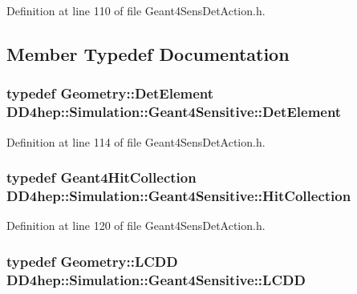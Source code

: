 Definition at line 110 of file Geant4SensDetAction.h.

\subsection{Member Typedef Documentation}
\hypertarget{class_d_d4hep_1_1_simulation_1_1_geant4_sensitive_a1cb1af5fb1194be1e1c1137f1e54272b}{
\subsubsection[{DetElement}]{\setlength{\rightskip}{0pt plus 5cm}typedef {\bf Geometry::DetElement} {\bf DD4hep::Simulation::Geant4Sensitive::DetElement}}}
\label{class_d_d4hep_1_1_simulation_1_1_geant4_sensitive_a1cb1af5fb1194be1e1c1137f1e54272b}


Definition at line 114 of file Geant4SensDetAction.h.\hypertarget{class_d_d4hep_1_1_simulation_1_1_geant4_sensitive_a160ee45c4477c7165b1d56d377e5582f}{
\subsubsection[{HitCollection}]{\setlength{\rightskip}{0pt plus 5cm}typedef {\bf Geant4HitCollection} {\bf DD4hep::Simulation::Geant4Sensitive::HitCollection}}}
\label{class_d_d4hep_1_1_simulation_1_1_geant4_sensitive_a160ee45c4477c7165b1d56d377e5582f}


Definition at line 120 of file Geant4SensDetAction.h.\hypertarget{class_d_d4hep_1_1_simulation_1_1_geant4_sensitive_a3373caa6917867ca7c871df20fb467c8}{
\subsubsection[{LCDD}]{\setlength{\rightskip}{0pt plus 5cm}typedef {\bf Geometry::LCDD} {\bf DD4hep::Simulation::Geant4Sensitive::LCDD}}}
\label{class_d_d4hep_1_1_simulation_1_1_geant4_sensitive_a3373caa6917867ca7c871df20fb467c8}


